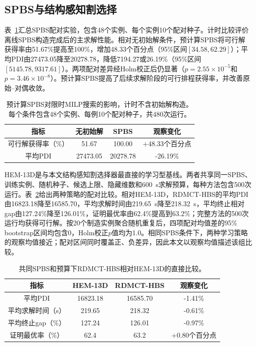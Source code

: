 \documentclass[final,5p,times,twocolumn]{elsarticle}
\newcommand{\method}{RDMCT-HBS}
\begin{document}
\subsection{SPBS与结构感知割选择}

表~\ref{tab:spbs-zh-new}汇总SPBS配对实验，包含48个实例、每个实例10个配对种子。计时比较评价离线SPBS构造完成后的主求解性能。相对无初始解条件，预计算SPBS将可行解获得率由51.67\%提高至100\%，增加48.33个百分点（95\%区间$[34.58,62.29]$）；平均PDI由27473.05降至20278.78，降低7194.27或26.19\%（95\%区间$[5145.78,9317.61]$）。两项配对差异经Holm校正后仍显著（$p=2.55\times10^{-5}$和$p=3.46\times10^{-8}$）。预计算SPBS提高了后续求解阶段的可行排程获得率，并改善原始--对偶收敛。

\begin{table}[!htbp]
\centering
\scriptsize
\setlength{\tabcolsep}{3pt}
\caption{预计算SPBS对限时MILP搜索的影响，计时不含初始解构造。每个条件包含48个实例、每例10个配对种子，共480次运行。}
\label{tab:spbs-zh-new}
\begin{tabular}{cccc}
\toprule
指标 & 无初始解 & SPBS & 观察变化\\
\midrule
可行解获得率（\%） & 51.67 & 100.00 & +48.33个百分点\\
平均PDI & 27473.05 & 20278.78 & -26.19\%\\
\bottomrule
\end{tabular}
\end{table}

HEM-13D是与本文结构感知割选择器最直接的学习型基线。两者共享同一SPBS、训练实例、随机种子、候选上限、隐藏维数和600~s求解预算，每种方法包含500次运行。表~\ref{tab:hem-direct-zh}给出两种策略的配对比较。相对HEM-13D，\method{}的平均PDI由16823.18降至16585.70，平均求解时间由219.65~s降至218.32~s，平均终止相对gap由127.24\%降至126.01\%，证明最优率由62.4\%提高到63.2\%；完整方法的500次运行均获得可行解。按20个制造实例聚合随机重复后，四项配对均值差的95\% bootstrap区间均包含0，Holm校正$p$值均为1.0。相同SPBS条件下，两种学习策略的观察均值接近；配对区间同时覆盖正、负差异，因此本文以观察均值描述该组比较。

\begin{table}[!htbp]
\centering
\scriptsize
\caption{共同SPBS和预算下\method{}相对HEM-13D的直接比较。}
\label{tab:hem-direct-zh}
\begin{tabular}{cccc}
\toprule
指标 & HEM-13D & \method{} & 观察变化\\
\midrule
平均PDI & 16823.18 & 16585.70 & -1.41\%\\
平均求解时间（s） & 219.65 & 218.32 & -0.61\%\\
平均终止gap（\%） & 127.24 & 126.01 & -0.97\%\\
证明最优率（\%） & 62.4 & 63.2 & +0.80个百分点\\
\bottomrule
\end{tabular}
\end{table}
\end{document}
